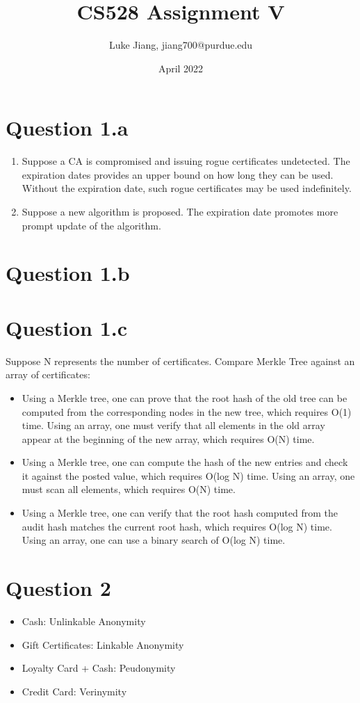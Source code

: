 \documentclass{article}
\title{CS528 Assignment V}
\author{Luke Jiang, jiang700@purdue.edu }
\date{April 2022}
\begin{document}
\maketitle

\section{Question 1.a}
\begin{enumerate}
    \item Suppose a CA is compromised and issuing rogue certificates undetected. The expiration dates provides an upper bound on how long they can be used. Without the expiration date, such rogue certificates may be used indefinitely.
    \item Suppose a new algorithm is proposed. The expiration date promotes more prompt update of the algorithm.
\end{enumerate}
\newpage

\section{Question 1.b}

\newpage

\section{Question 1.c}
Suppose N represents the number of certificates. Compare Merkle Tree against an array of certificates:
\begin{itemize}
    \item Using a Merkle tree, one can prove that the root hash of the old tree can be computed from the corresponding nodes in the new tree, which requires O(1) time. Using an array, one must verify that all elements in the old array appear at the beginning of the new array, which requires O(N) time.
    \item Using a Merkle tree, one can compute the hash of the new entries and check it against the posted value, which requires O(log N) time. Using an array, one must scan all elements, which requires O(N) time.
    \item Using a Merkle tree, one can verify that the root hash computed from the audit hash matches the current root hash, which requires O(log N) time. Using an array, one can use a binary search of O(log N) time.
\end{itemize}
\newpage

\section{Question 2}
\begin{itemize}
    \item Cash: Unlinkable Anonymity
    \item Gift Certificates: Linkable Anonymity
    \item Loyalty Card + Cash: Peudonymity
    \item Credit Card: Verinymity
\end{itemize}
\newpage
\end{document}
